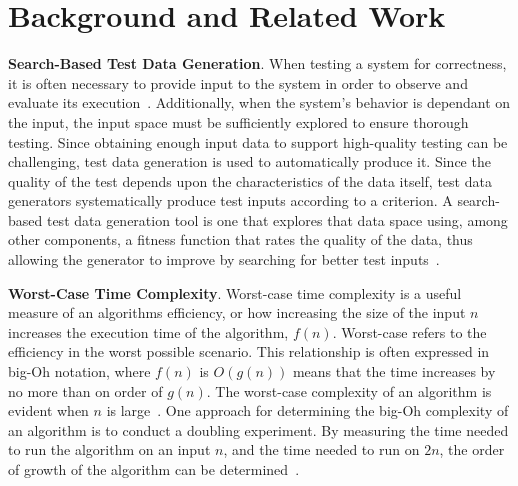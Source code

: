 
\section{Background and Related Work}



{\bf Search-Based Test Data Generation}. When testing a system for correctness, it is often necessary to provide input
to the system in order to observe and evaluate its execution~\cite{ammann2008}. Additionally, when the system's behavior
is dependant on the input, the input space must be sufficiently explored to ensure thorough testing.  Since obtaining
enough input data to support high-quality testing can be challenging, test data generation is used to automatically
produce it. Since the quality of the test depends upon the characteristics of the data itself, test data generators
systematically produce test inputs according to a criterion. A search-based test data generation tool is one that
explores that data space using, among other components, a fitness function that rates the quality of the data, thus
allowing the generator to improve by searching for better test inputs~\cite{mcminn2004a}.




{\bf Worst-Case Time Complexity}. Worst-case time complexity is a useful measure of an algorithms efficiency, or how
increasing the size of the input $n$ increases the execution time of the algorithm, $f(n)$.  Worst-case refers to the
efficiency in the worst possible scenario.  This relationship is often expressed in big-Oh notation, where $f(n)$ is
$O(g(n))$ means that the time increases by no more than on order of $g(n)$. The worst-case complexity of an algorithm is
evident when $n$ is large~\cite{Goodrich2014}. One approach for determining the big-Oh complexity of an algorithm is to
conduct a doubling experiment. By measuring the time needed to run the algorithm on an input $n$, and the time needed to
run on $2n$, the order of growth of the algorithm can be determined~\cite{McGeoch2012,Sedgewick1998}.

